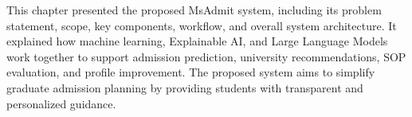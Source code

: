\vspace{30pt}
\justify
This chapter presented the proposed MsAdmit system, including its problem statement, scope, key components, workflow, and overall system architecture. It explained how machine learning, Explainable AI, and Large Language Models work together to support admission prediction, university recommendations, SOP evaluation, and profile improvement. The proposed system aims to simplify graduate admission planning by providing students with transparent and personalized guidance.



